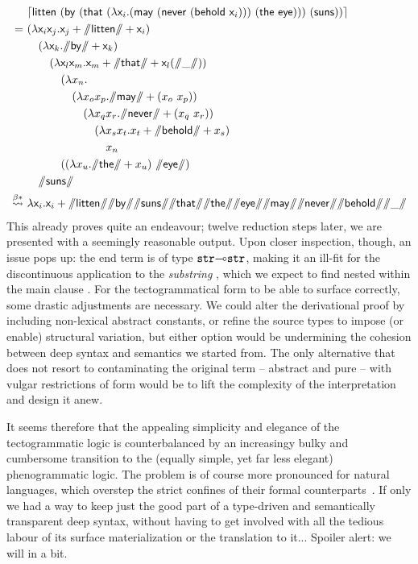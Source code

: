 {\smaller
\begin{equation}\label{equation:acg_pheno}
	\begin{aligned}
	& 			\hm{\term{litten~(by~(that~(\lam \vari .(may~(never~(behold~\vari )))~(the~eye)))~(suns))}} \\
	= \ 
	&							(\lam \vari\varj.\varj + \str{litten}+ \vari) \\
	&\quad								(\lam \vark.\str{by}+ \vark)\\
	&\qquad									(\lam \varl\varm. \varm + \str{that} + \varl(\str{\gap}))\\
	&\qqquad								(\lam x_n. \\
	&\qqquad\quad										(\lam x_o x_p.\str{may}+(x_o ~x_p))\\
	&\qqquad\qquad											(\lam x_q x_r.\str{never}+(x_q~x_r))\\
	&\qqquad\qqquad												(\lam x_sx_t.x_t+\str{behold}+x_s)\\
	&\qqquad\qqqquad												x_n \\
	&\qqquad												((\lam x_u.\str{the}+x_u)~\str{eye})\\
	&\quad									\str{suns}\\
	\bredstar \ & \term{\lam \vari.\vari + \str{litten}\str{by}\str{suns}\str{that}\str{the}\str{eye}\str{may}\str{never}\str{behold}}\str{\gap}
	\end{aligned}
\end{equation}
}%
This already proves quite an endeavour; twelve reduction steps later, we are presented with a seemingly reasonable output.
Upon closer inspection, though, an issue pops up: the end term is of type $\mathtt{str}\li\mathtt{str}$, making it an ill-fit for the discontinuous application to the \textit{substring} , which we expect to find nested within the main clause .
For the tectogrammatical form to be able to surface correctly, some drastic adjustments are necessary.
We could alter the derivational proof by including non-lexical abstract constants, or refine the source types to impose (or enable) structural variation, but either option would be undermining the cohesion between deep syntax and semantics we started from.
The only alternative that does not resort to contaminating the original term -- abstract and pure -- with vulgar restrictions of form would be to lift the complexity of the interpretation and design it anew.

It seems therefore that the appealing simplicity and elegance of the tectogrammatic logic is counterbalanced by an increasingy bulky and cumbersome transition to the (equally simple, yet far less elegant) phenogrammatic logic.
The problem is of course more pronounced for natural languages, which overstep the strict confines of their formal counterparts~\cite{moot2014hybrid}.
If only we had a way to keep just the good part of a type-driven and semantically transparent deep syntax, without having to get involved with all the tedious labour of its surface materialization or the translation to it...
Spoiler alert: we will in a bit.

